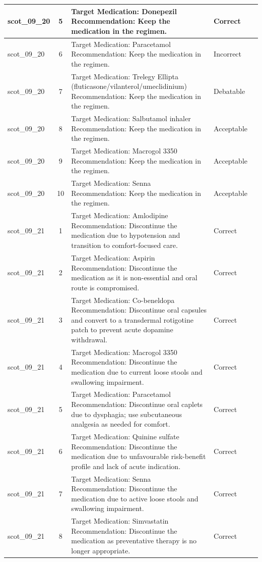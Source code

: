 \begin{longtable}{|p{1.45cm}|c|p{10.2cm}|p{1.55cm}|p{2.3cm}|}
\hline
scot\_09\_20 & 5 & Target Medication: Donepezil Recommendation: Keep the medication in the regimen. & Correct &  \\
\hline
scot\_09\_20 & 6 & Target Medication: Paracetamol Recommendation: Keep the medication in the regimen. & Incorrect &  \\
\hline
scot\_09\_20 & 7 & Target Medication: Trelegy Ellipta (fluticasone/vilanterol/umeclidinium) Recommendation: Keep the medication in the regimen. & Debatable &  \\
\hline
scot\_09\_20 & 8 & Target Medication: Salbutamol inhaler Recommendation: Keep the medication in the regimen. & Acceptable &  \\
\hline
scot\_09\_20 & 9 & Target Medication: Macrogol 3350 Recommendation: Keep the medication in the regimen. & Acceptable &  \\
\hline
scot\_09\_20 & 10 & Target Medication: Senna Recommendation: Keep the medication in the regimen. & Acceptable &  \\
\hline
scot\_09\_21 & 1 & Target Medication: Amlodipine Recommendation: Discontinue the medication due to hypotension and transition to comfort-focused care. & Correct &  \\
\hline
scot\_09\_21 & 2 & Target Medication: Aspirin Recommendation: Discontinue the medication as it is non-essential and oral route is compromised. & Correct &  \\
\hline
scot\_09\_21 & 3 & Target Medication: Co-beneldopa Recommendation: Discontinue oral capsules and convert to a transdermal rotigotine patch to prevent acute dopamine withdrawal. & Correct &  \\
\hline
scot\_09\_21 & 4 & Target Medication: Macrogol 3350 Recommendation: Discontinue the medication due to current loose stools and swallowing impairment. & Correct &  \\
\hline
scot\_09\_21 & 5 & Target Medication: Paracetamol Recommendation: Discontinue oral caplets due to dysphagia; use subcutaneous analgesia as needed for comfort. & Correct &  \\
\hline
scot\_09\_21 & 6 & Target Medication: Quinine sulfate Recommendation: Discontinue the medication due to unfavourable risk-benefit profile and lack of acute indication. & Correct &  \\
\hline
scot\_09\_21 & 7 & Target Medication: Senna Recommendation: Discontinue the medication due to active loose stools and swallowing impairment. & Correct &  \\
\hline
scot\_09\_21 & 8 & Target Medication: Simvastatin Recommendation: Discontinue the medication as preventative therapy is no longer appropriate. & Correct &  \\

\end{longtable}

